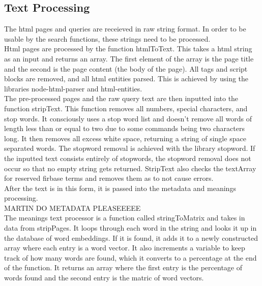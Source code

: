 \subsection{Text Processing}
The html pages and queries are receieved in raw string format. In order to be usable by the search functions, these strings need to be processed. \\
Html pages are processed by the function htmlToText. This takes a html string as an input and returns an array. The first element of the array is the page title and the second is the page content (the body of the page). All tags and script blocks are removed, and all html entities parsed. This is achieved by using the libraries node-html-parser and html-entities. \\ 
The pre-processed pages and the raw query text are then inputted into the function stripText. This function removes all numbers, special characters, and stop words. It consciously uses a stop word list and doesn't remove all words of length less than or equal to two due to some commands being two characters long. It then removes all excess white space, returning a string of single space separated words. The stopword removal is achieved with the library stopword. If the inputted text consists entirely of stopwords, the stopword removal does not occur so that no empty string gets returned. StripText also checks the textArray for reserved firbase terms and removes them as to not cause errors.\\
After the text is in this form, it is passed into the metadata and meanings processing. \\
MARTIN DO METADATA PLEASEEEEE\\
The meanings text processor is a function called stringToMatrix and takes in data from stripPages. It loops through each word in the string and looks it up in the database of word embeddings. If it is found, it adds it to a newly constructed array where each entry is a word vector. It also increments a variable to keep track of how many words are found, which it converts to a percentage at the end of the function. It returns an array where the first entry is the percentage of words found and the second entry is the matric of word vectors.
